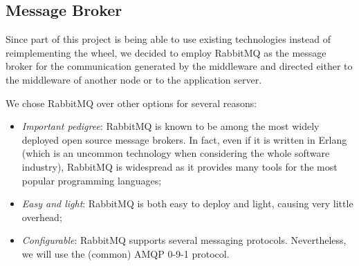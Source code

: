 \subsection{Message Broker}
Since part of this project is being able to use existing technologies instead of
reimplementing the wheel, we decided to employ RabbitMQ as the message broker
for the communication generated by the middleware and directed either to
the middleware of another node or to the application server.

We chose RabbitMQ over other options for several reasons:
\begin{itemize}
  \item \textit{Important pedigree}: RabbitMQ is known to be among the
        most widely deployed open source message brokers. In fact, even if it
        is written in Erlang (which is an uncommon technology when considering
        the whole software industry), RabbitMQ is widespread as it provides many
        tools for the most popular programming languages;
  \item \textit{Easy and light}: RabbitMQ is both easy to deploy and light,
  	causing very little overhead;
  \item \textit{Configurable}: RabbitMQ supports several messaging protocols.
        Nevertheless, we will use the (common) AMQP 0-9-1 protocol.
\end{itemize}

